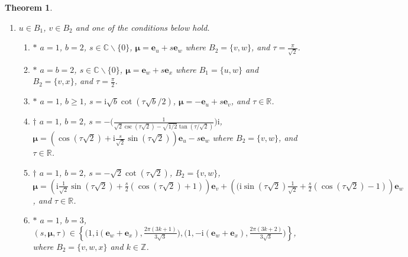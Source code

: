 \documentclass{article}
\numberwithin{equation}{section}
\newtheorem{theorem}[lemma]{Theorem}
\newcommand{\be}{\mathbf e}
\newcommand{\bmu}{{\boldsymbol{\mu}}}
\def\C{\mathbb{C}}
\def\R{\mathbb{R}}
\def\Z{\mathbb{Z}}
\def\ii{\mathrm{i}}
\begin{document}
{\begin{theorem}
\begin{enumerate}
\begin{enumerate}
\item $*$ $a=3$, $b\geq 1$, $s=\frac{1}{2}$, $\bmu=\be_w+\frac{1}{2}\be_x$ where $B_1=\{u,w,v\}$, and $\tau=\frac{\pi}{\sqrt{3b}}$. 

\item $\dagger$ $a=2$, $b=1$, $s=\cot^2(\tau/\sqrt{2})
$, $\bmu=(s-1)\be_v+\frac{1+s}{\sqrt{2}}\ii\sin(\tau\sqrt{2})\be_w$ where $B_2=\{w\}$, and $\tau\in\R$.
\item $\dagger$ $a=2$, $b=1$, $s=\tan^2(\tau/\sqrt{2})$, $\bmu=(1-s)\be_u+\frac{1+s}{\sqrt{2}}\ii\sin(\tau\sqrt{2})\be_w$ where $B_2=\{w\}$, and $\tau\in\R$.

\item $*$ $a=3$, $b=1$, $s=1$, $(\bmu,\tau)\in\{\big(-\be_x+\ii\be_w,\frac{2\pi(3k+1)}{3\sqrt{3}}\big),\big(-\be_x-\ii\be_w,\frac{2\pi(3k+2)}{3\sqrt{3}}\big)\}$ where $B_1=\{u,v,x\}$, $B_2=\{w\}$ and $k\in\Z$.

\item $*$ $a=2$, $b=2$, $s=1$, and $\bmu=\ii(\be_w+\be_x)$ where $B_2=\{w,x\}$, and $\tau=\frac{\pi}{4}$.
\end{enumerate}

\item $u\in B_1$, $v\in B_2$ and one of the conditions below hold.
\begin{enumerate}
\item $*$ $a=1$, $b=2$, $s\in\C\backslash\{0\}$, $\bmu=\be_u+s\be_w$ where $B_2=\{v,w\}$, and $\tau=\frac{\pi}{\sqrt{2}}$.
\item $*$ $a=b=2$, $s\in\C\backslash\{0\}$, $\bmu=\be_w+s\be_x$ where $B_1=\{u,w\}$ and $B_2=\{v,x\}$, and $\tau=\frac{\pi}{2}$.
\item $*$ $a=1$, $b\geq 1$, $s=\ii\sqrt{b}\cot(\tau\sqrt{b}/2)
$, $\bmu=-\be_u+s\be_v$, and $\tau\in\R$. 
\item $\dagger$ $a=1$, $b=2$, $s=-\bigg(\frac{1}{\sqrt{2}\csc(\tau\sqrt{2})-\sqrt{1/2}\tan(\tau/\sqrt{2})}\bigg)\ii $, $\bmu=\left(\cos( \tau\sqrt{2})+\ii \frac{s}{\sqrt{2}}\sin(\tau\sqrt{2})\right)\be_u -s\be_w$
where $B_2=\{v,w\}$, and $\tau\in\R$.
\item $\dagger$ $a=1$, $b=2$, $s=-\sqrt{2}\cot(\tau\sqrt{2})$, %
$B_2=\{v,w\}$, $\bmu=\left(\ii\frac{1}{\sqrt{2}}\sin(\tau\sqrt{2})+\frac{s}{2}(\cos(\tau\sqrt{2})+1)\right)\be_v+\left((\ii\sin(\tau\sqrt{2})\frac{1}{\sqrt{2}}+\frac{s}{2}(\cos(\tau\sqrt{2})-1)\right)\be_w$, and $\tau\in\R$.
\item $*$ $a=1$, $b=3$, $(s,\bmu,\tau)\in\left\{\big(1,\ii(\be_w+\be_x),\frac{2\pi(3k+1)}{3\sqrt{3}}\big),\big(1,-\ii(\be_w+\be_x),\frac{2\pi(3k+2)}{3\sqrt{3}}\big)\right\}$, where $B_2=\{v,w,x\}$ and $k\in \Z$.



\end{enumerate}
\end{enumerate}
\end{theorem}}
\end{document}
